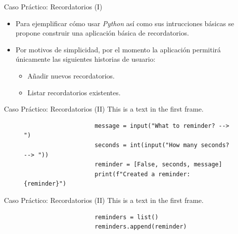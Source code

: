 \documentclass{beamer}
\begin{document}
    \begin{frame}{Caso Práctico: Recordatorios (I)}
        \noindent
        \begin{minipage}{.69\textwidth}
          \begin{itemize}
            \item Para ejemplificar cómo usar \emph{Python} así como sus intrucciones básicas se propone construir una aplicación básica de recordatorios.
            \item Por motivos de simplicidad, por el momento la aplicación permitirá únicamente las siguientes historias de usuario:
              \begin{itemize}
                \item Añadir nuevos recordatorios.
                \item Listar recordatorios existentes.
              \end{itemize}
          \end{itemize}
        \end{minipage}
        \begin{minipage}{.29\textwidth}
            \begin{center}
              \fontsize{40}{50}
            \end{center}
        \end{minipage}
    \end{frame}

    \begin{frame}[fragile]{Caso Práctico: Recordatorios (II)}
        This is a text in the first frame.
        \begin{figure}
            \begin{minipage}[c]{0.7\textwidth}
                \begin{verbatim}
                    message = input("What to reminder? --> ")
                    seconds = int(input("How many seconds? --> "))
                    reminder = [False, seconds, message]
                    print(f"Created a reminder: {reminder}")
                \end{verbatim}
            \end{minipage}
        \end{figure}
    \end{frame}


    \begin{frame}[fragile]{Caso Práctico: Recordatorios (II)}
        This is a text in the first frame.
        \begin{figure}
            \begin{minipage}[c]{0.7\textwidth}
                \begin{verbatim}
                    reminders = list()
                    reminders.append(reminder)
                \end{verbatim}
            \end{minipage}
        \end{figure}
    \end{frame}
\end{document}
